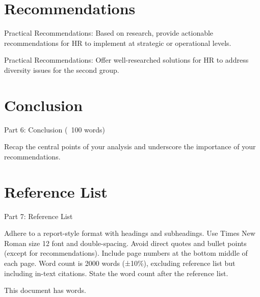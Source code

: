 \documentclass{article}
\begin{document}
\section{Recommendations}
Practical Recommendations: Based on research, provide actionable recommendations for HR to implement at strategic or operational levels.

Practical Recommendations: Offer well-researched solutions for HR to address diversity issues for the second group.

\section{Conclusion}
Part 6: Conclusion (~100 words)

Recap the central points of your analysis and underscore the importance of your recommendations.
\section{Reference List}
Part 7: Reference List

Adhere to a report-style format with headings and subheadings.
Use Times New Roman size 12 font and double-spacing.
Avoid direct quotes and bullet points (except for recommendations).
Include page numbers at the bottom middle of each page.
Word count is 2000 words (±10\%), excluding reference list but including in-text citations.
State the word count after the reference list.

\printbibliography
This document has \emph{\bashStdout} words.
\end{document}
